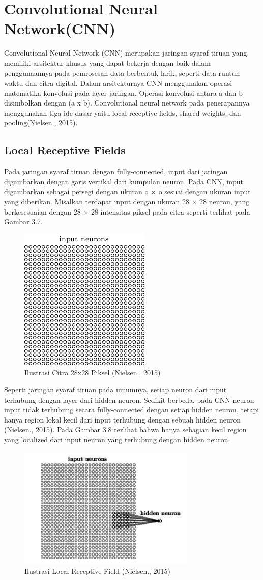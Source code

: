 \section{Convolutional Neural Network(CNN)}
Convolutional Neural Network (CNN) merupakan jaringan syaraf tiruan yang memiliki arsitektur khusus yang dapat bekerja dengan baik dalam penggunaannya pada pemrosesan data berbentuk larik, seperti data runtun waktu dan citra digital. Dalam arsitekturnya CNN menggunakan operasi matematika konvolusi pada layer jaringan. Operasi konvolusi antara a dan b disimbolkan dengan (a x b). Convolutional neural network pada penerapannya menggunakan tiga ide dasar yaitu local receptive fields, shared weights, dan pooling(Nielsen., 2015).
\subsection{Local Receptive Fields}
Pada jaringan syaraf tiruan dengan fully-connected, input dari jaringan 
digambarkan dengan garis vertikal dari kumpulan neuron. Pada CNN, input digambarkan sebagai persegi dengan ukuran o × o sesuai dengan ukuran input yang 
diberikan. Misalkan terdapat input dengan ukuran 28 × 28 neuron, yang 
berkesesuaian dengan 28 × 28 intensitas piksel pada citra seperti terlihat pada 
Gambar 3.7.
\begin{figure}[h]
	\centering
	\includegraphics[width=0.25\linewidth]{neuraon}
	\caption{Ilustrasi Citra 28x28 Piksel (Nielsen., 2015)}
	\label{fig:neuraon}
\end{figure}

Seperti jaringan syaraf tiruan pada umumnya, setiap neuron dari input
terhubung dengan layer dari hidden neuron. Sedikit berbeda, pada CNN neuron 
input tidak terhubung secara fully-connected dengan setiap hidden neuron, tetapi 
hanya region lokal kecil dari input terhubung dengan sebuah hidden neuron
(Nielsen., 2015). Pada Gambar 3.8 terlihat bahwa hanya sebagian kecil region
yang localized dari input neuron yang terhubung dengan hidden neuron.
\begin{figure}[h]
	\centering
	\includegraphics[width=0.5\linewidth]{hidenneuron}
	\caption{Ilustrasi Local Receptive Field (Nielsen., 2015)}
	\label{fig:hidenneuron}
\end{figure}

